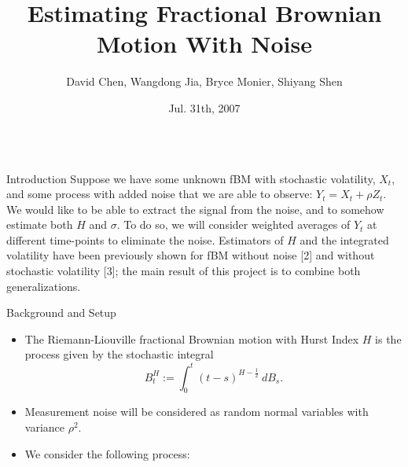 \documentclass[final,hyperref={pdfpagelabels=false}]{beamer}
\title[fBM Estimation Under Noise]{Estimating Fractional Brownian Motion With Noise}
\author[Chen & Jia & Monier & Shen]{David Chen, Wangdong Jia, Bryce Monier, Shiyang Shen}
\institute[Columbia University]{Columbia Math Undergraduate Summer Research Program}
\date{Jul. 31th, 2007}
\begin{document}
  \begin{frame}{} 
    \vfill
    \begin{columns}[t]
      \begin{column}{0.28\linewidth}
        \begin{block}{Introduction}
          Suppose we have some unknown fBM with stochastic volatility, \(X_t\), and some process with added noise that we are able to observe: \(Y_t = X_t + \rho Z_t\).  We would like to be able to extract the signal from the noise, and to somehow estimate both \(H\) and \(\sigma\). To do so, we will consider weighted averages of \(Y_t\) at different time-points to eliminate the noise. Estimators of \(H\) and the integrated volatility have been previously shown for fBM without noise [2] and without stochastic volatility [3]; the main result of this project is to combine both generalizations.
        \end{block}
        \begin{block}{Background and Setup}
          \begin{itemize}
            \item The Riemann-Liouville fractional Brownian motion with Hurst Index \(H\) is the process given by the stochastic integral
              \[
                B^H_t := \int_0^t (t-s)^{H - \frac{1}{2}} \ dB_s.
              \]
            \item Measurement noise will be considered as random normal variables with variance \(\rho^2\).
            \item We consider the following process:

\end{itemize}
\end{block}
\end{column}
\end{columns}
\end{frame}
\end{document}
